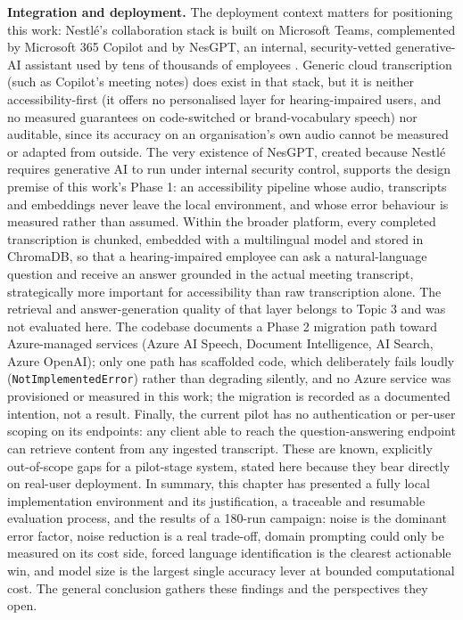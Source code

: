 \documentclass[12pt]{report}
\begin{document}
\textbf{Integration and deployment.} The deployment context matters for positioning this work: Nestl\'e's collaboration stack is built on Microsoft Teams, complemented by Microsoft 365 Copilot and by NesGPT, an internal, security-vetted generative-AI assistant used by tens of thousands of employees \cite{worklife2024nesgpt,arec2023nestle}. Generic cloud transcription (such as Copilot's meeting notes) does exist in that stack, but it is neither accessibility-first (it offers no personalised layer for hearing-impaired users, and no measured guarantees on code-switched or brand-vocabulary speech) nor auditable, since its accuracy on an organisation's own audio cannot be measured or adapted from outside. The very existence of NesGPT, created because Nestl\'e requires generative AI to run under internal security control, supports the design premise of this work's Phase 1: an accessibility pipeline whose audio, transcripts and embeddings never leave the local environment, and whose error behaviour is measured rather than assumed. Within the broader platform, every completed transcription is chunked, embedded with a multilingual model and stored in ChromaDB, so that a hearing-impaired employee can ask a natural-language question and receive an answer grounded in the actual meeting transcript, strategically more important for accessibility than raw transcription alone. The retrieval and answer-generation quality of that layer belongs to Topic 3 and was not evaluated here. The codebase documents a Phase 2 migration path toward Azure-managed services (Azure AI Speech, Document Intelligence, AI Search, Azure OpenAI); only one path has scaffolded code, which deliberately fails loudly (\texttt{NotImplementedError}) rather than degrading silently, and no Azure service was provisioned or measured in this work; the migration is recorded as a documented intention, not a result. Finally, the current pilot has no authentication or per-user scoping on its endpoints: any client able to reach the question-answering endpoint can retrieve content from any ingested transcript. These are known, explicitly out-of-scope gaps for a pilot-stage system, stated here because they bear directly on real-user deployment.
\vspace{0.5em}
In summary, this chapter has presented a fully local implementation environment and its justification, a traceable and resumable evaluation process, and the results of a 180-run campaign: noise is the dominant error factor, noise reduction is a real trade-off, domain prompting could only be measured on its cost side, forced language identification is the clearest actionable win, and model size is the largest single accuracy lever at bounded computational cost. The general conclusion gathers these findings and the perspectives they open.
\end{document}
